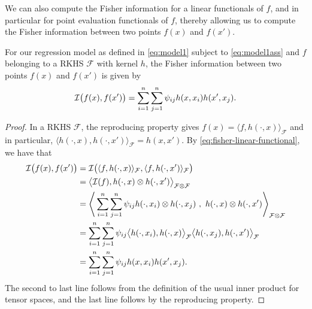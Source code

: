 We can also compute the Fisher information for a linear functionals of $f$, and in particular for point evaluation functionals of $f$, thereby allowing us to compute the Fisher information between two points $f(x)$ and $f(x')$.

\begin{corollary}\label{thm:fisherreglinfunc}
	For our regression model as defined in \eqref{eq:model1} subject to \eqref{eq:model1ass} and $f$ belonging to a RKHS $\mathcal F$ with kernel $h$, the Fisher information between two points $f(x)$ and $f(x')$ is given by
	\[
		{\mathcal I}\big(f(x),f(x')\big) = \sum_{i=1}^n\sum_{j=1}^n \psi_{ij} h(x,x_i)h(x',x_j).
	\]
\end{corollary}

\newcommand{\mycomment}[2][10pt]{\hspace{#1}\rlap{\color{gray}\text{#2}}}

\begin{proof}
  In a RKHS $\mathcal F$, the reproducing property gives $f(x) = \langle f, h(\cdot, x) \rangle_{\mathcal F}$ and in particular, $\langle h(\cdot,x), h(\cdot, x') \rangle_{\mathcal F} = h(x,x')$. 
  By \eqref{eq:fisher-linear-functional}, we have that
  \begin{align*}
    {\mathcal I}\big(f(x),f(x')\big) 
    &= {\mathcal I}\big(\langle f, h(\cdot, x) \rangle_{{\mathcal F}},\langle f, h(\cdot, x') \rangle_{{\mathcal F}} \big) \\
    &= \big\langle {\mathcal I}(f), h(\cdot, x) \otimes h(\cdot, x') \big\rangle_{\mathcal F \otimes \mathcal F} \\
    &= \Bigg\langle \sum_{i=1}^n\sum_{j=1}^n \psi_{ij} h(\cdot,x_i) \otimes h(\cdot,x_j) \ , \ h(\cdot, x) \otimes h(\cdot, x') \Bigg\rangle_{\mathcal F \otimes \mathcal F} \\
    &= \sum_{i=1}^n\sum_{j=1}^n \psi_{ij} \big\langle h(\cdot,x_i), h(\cdot, x) \big\rangle_{\mathcal F} \big\langle h(\cdot,x_j), h(\cdot, x') \big\rangle_{\mathcal F } \\
    &= \sum_{i=1}^n\sum_{j=1}^n \psi_{ij} h(x,x_i) h(x', x_j).
  \end{align*}
  The second to last line follows from the definition of the usual inner product for tensor spaces, and the last line follows by the reproducing property.
\end{proof}

